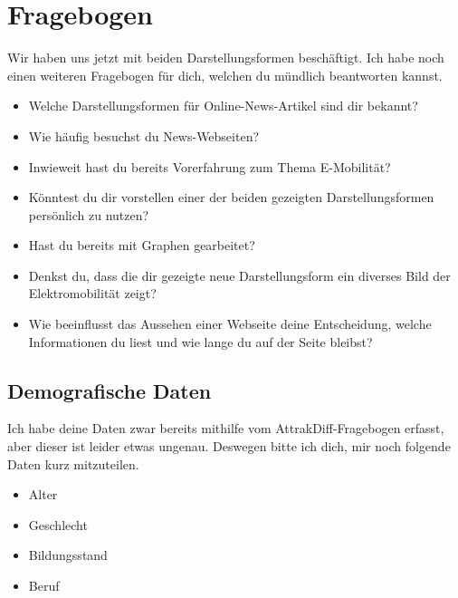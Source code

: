 \section{Fragebogen}
Wir haben uns jetzt mit beiden Darstellungsformen beschäftigt.
Ich habe noch einen weiteren Fragebogen für dich, welchen du mündlich beantworten kannst.
\begin{itemize}
    \item Welche Darstellungsformen für Online-News-Artikel sind dir bekannt?
    \item Wie häufig besuchst du News-Webseiten?
    \item Inwieweit hast du bereits Vorerfahrung zum Thema E-Mobilität?
    \item Könntest du dir vorstellen einer der beiden gezeigten Darstellungsformen persönlich zu nutzen?
    \item Hast du bereits mit Graphen gearbeitet?
    \item Denkst du, dass die dir gezeigte neue Darstellungsform ein diverses Bild der Elektromobilität zeigt?
    \item Wie beeinflusst das Aussehen einer Webseite deine Entscheidung, welche Informationen du liest und wie lange du auf der Seite bleibst?
\end{itemize}

\subsection{Demografische Daten}
Ich habe deine Daten zwar bereits mithilfe vom AttrakDiff-Fragebogen erfasst, aber dieser ist leider etwas ungenau.
Deswegen bitte ich dich, mir noch folgende Daten kurz mitzuteilen.
\begin{itemize}
    \item Alter
    \item Geschlecht
    \item Bildungsstand
    \item Beruf
\end{itemize}
